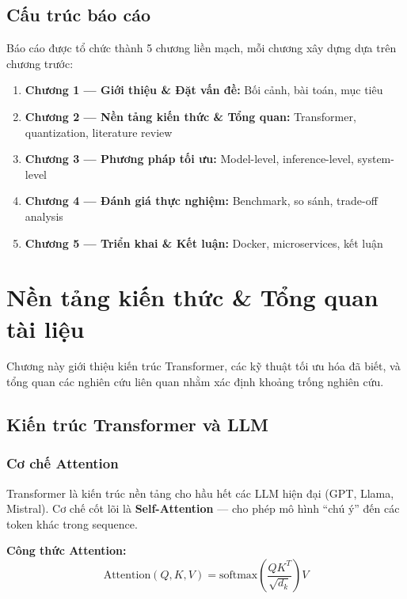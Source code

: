 \documentclass[12pt,a4paper]{report}
\begin{document}
\section{Cấu trúc báo cáo}

Báo cáo được tổ chức thành 5 chương liền mạch, mỗi chương xây dựng dựa trên chương trước:

\begin{enumerate}
  \item \textbf{Chương 1 --- Giới thiệu \& Đặt vấn đề:} Bối cảnh, bài toán, mục tiêu
  \item \textbf{Chương 2 --- Nền tảng kiến thức \& Tổng quan:} Transformer, quantization, literature review
  \item \textbf{Chương 3 --- Phương pháp tối ưu:} Model-level, inference-level, system-level
  \item \textbf{Chương 4 --- Đánh giá thực nghiệm:} Benchmark, so sánh, trade-off analysis
  \item \textbf{Chương 5 --- Triển khai \& Kết luận:} Docker, microservices, kết luận
\end{enumerate}

\newpage

\chapter{Nền tảng kiến thức \& Tổng quan tài liệu}

Chương này giới thiệu kiến trúc Transformer, các kỹ thuật tối ưu hóa đã biết, và tổng quan các nghiên cứu liên quan nhằm xác định khoảng trống nghiên cứu.

\section{Kiến trúc Transformer và LLM}

\subsection{Cơ chế Attention}

Transformer là kiến trúc nền tảng cho hầu hết các LLM hiện đại (GPT, Llama, Mistral). Cơ chế cốt lõi là \textbf{Self-Attention} --- cho phép mô hình ``chú ý'' đến các token khác trong sequence.

\textbf{Công thức Attention:}
\begin{equation}
\text{Attention}(Q, K, V) = \text{softmax}\left(\frac{QK^T}{\sqrt{d_k}}\right)V
\end{equation}
\end{document}
